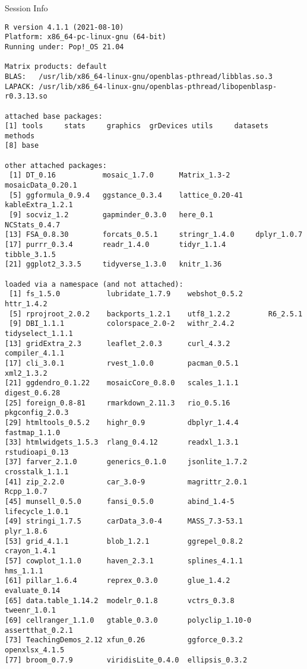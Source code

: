 \documentclass[10pt,handout]{beamer}\usepackage[]{graphicx}\usepackage[]{color}
\makeatletter
\newenvironment{kframe}{%
 \def\at@end@of@kframe{}%
 \ifinner\ifhmode%
  \def\at@end@of@kframe{\end{minipage}}%
  \begin{minipage}{\columnwidth}%
 \fi\fi%
 \def\FrameCommand##1{\hskip\@totalleftmargin \hskip-\fboxsep
 \colorbox{shadecolor}{##1}\hskip-\fboxsep
     \hskip-\linewidth \hskip-\@totalleftmargin \hskip\columnwidth}%
 \MakeFramed {\advance\hsize-\width
   \@totalleftmargin\z@ \linewidth\hsize
   \@setminipage}}%
 {\par\unskip\endMakeFramed%
 \at@end@of@kframe}
\newenvironment{knitrout}{}{} %
\makeatother
\begin{document}
\begin{frame}[fragile]{Session Info}
	\tiny
	
\begin{knitrout}\tiny
{}\color{fgcolor}\begin{kframe}
\begin{verbatim}
R version 4.1.1 (2021-08-10)
Platform: x86_64-pc-linux-gnu (64-bit)
Running under: Pop!_OS 21.04

Matrix products: default
BLAS:   /usr/lib/x86_64-linux-gnu/openblas-pthread/libblas.so.3
LAPACK: /usr/lib/x86_64-linux-gnu/openblas-pthread/libopenblasp-r0.3.13.so

attached base packages:
[1] tools     stats     graphics  grDevices utils     datasets  methods  
[8] base     

other attached packages:
 [1] DT_0.16           mosaic_1.7.0      Matrix_1.3-2      mosaicData_0.20.1
 [5] ggformula_0.9.4   ggstance_0.3.4    lattice_0.20-41   kableExtra_1.2.1 
 [9] socviz_1.2        gapminder_0.3.0   here_0.1          NCStats_0.4.7    
[13] FSA_0.8.30        forcats_0.5.1     stringr_1.4.0     dplyr_1.0.7      
[17] purrr_0.3.4       readr_1.4.0       tidyr_1.1.4       tibble_3.1.5     
[21] ggplot2_3.3.5     tidyverse_1.3.0   knitr_1.36       

loaded via a namespace (and not attached):
 [1] fs_1.5.0           lubridate_1.7.9    webshot_0.5.2      httr_1.4.2        
 [5] rprojroot_2.0.2    backports_1.2.1    utf8_1.2.2         R6_2.5.1          
 [9] DBI_1.1.1          colorspace_2.0-2   withr_2.4.2        tidyselect_1.1.1  
[13] gridExtra_2.3      leaflet_2.0.3      curl_4.3.2         compiler_4.1.1    
[17] cli_3.0.1          rvest_1.0.0        pacman_0.5.1       xml2_1.3.2        
[21] ggdendro_0.1.22    mosaicCore_0.8.0   scales_1.1.1       digest_0.6.28     
[25] foreign_0.8-81     rmarkdown_2.11.3   rio_0.5.16         pkgconfig_2.0.3   
[29] htmltools_0.5.2    highr_0.9          dbplyr_1.4.4       fastmap_1.1.0     
[33] htmlwidgets_1.5.3  rlang_0.4.12       readxl_1.3.1       rstudioapi_0.13   
[37] farver_2.1.0       generics_0.1.0     jsonlite_1.7.2     crosstalk_1.1.1   
[41] zip_2.2.0          car_3.0-9          magrittr_2.0.1     Rcpp_1.0.7        
[45] munsell_0.5.0      fansi_0.5.0        abind_1.4-5        lifecycle_1.0.1   
[49] stringi_1.7.5      carData_3.0-4      MASS_7.3-53.1      plyr_1.8.6        
[53] grid_4.1.1         blob_1.2.1         ggrepel_0.8.2      crayon_1.4.1      
[57] cowplot_1.1.0      haven_2.3.1        splines_4.1.1      hms_1.1.1         
[61] pillar_1.6.4       reprex_0.3.0       glue_1.4.2         evaluate_0.14     
[65] data.table_1.14.2  modelr_0.1.8       vctrs_0.3.8        tweenr_1.0.1      
[69] cellranger_1.1.0   gtable_0.3.0       polyclip_1.10-0    assertthat_0.2.1  
[73] TeachingDemos_2.12 xfun_0.26          ggforce_0.3.2      openxlsx_4.1.5    
[77] broom_0.7.9        viridisLite_0.4.0  ellipsis_0.3.2    
\end{verbatim}
\end{kframe}
\end{knitrout}
	
\end{frame}
\end{document}
